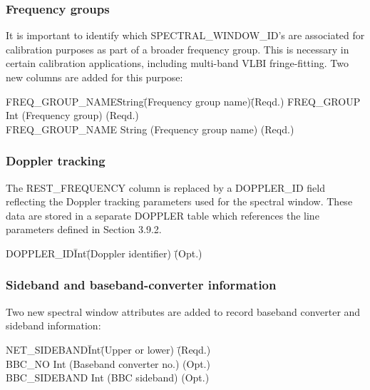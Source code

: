 \documentclass{article}
\begin{document}
\begin{itemize}
\subsubsection{Frequency groups}

It is important to identify which SPECTRAL\_WINDOW\_ID's are
associated for calibration purposes as part of a broader frequency
group.  This is necessary in certain calibration applications,
including multi-band VLBI fringe-fitting. Two new columns are
added for this purpose:

\begin{tabbing}
FREQ\_GROUP\_NAME\quad\quad \= String\quad\quad \=
(Frequency group name)\quad\quad \= (Reqd.) \kill
FREQ\_GROUP \> Int \> (Frequency group) \> (Reqd.) \\
FREQ\_GROUP\_NAME \> String \> (Frequency group name) \> (Reqd.) \\
\end{tabbing}

\subsubsection{Doppler tracking}

The REST\_FREQUENCY column is replaced by a DOPPLER\_ID field
reflecting the Doppler tracking parameters used for the spectral
window. These data are stored in a separate DOPPLER table which
references the line parameters defined in Section 3.9.2.

\begin{tabbing}
DOPPLER\_ID\quad\quad \= Int\quad\quad \= 
(Doppler identifier) \quad\quad\quad\quad\quad \= (Opt.) \\
\end{tabbing}

\subsubsection{Sideband and baseband-converter information}

Two new spectral window attributes are added to record baseband
converter and sideband information:

\begin{tabbing}
NET\_SIDEBAND\quad\quad \= Int\quad\quad \= 
(Upper or lower) \quad\quad\quad\quad\quad \= (Reqd.) \\
BBC\_NO           \> Int  \> 
(Baseband converter no.) \> (Opt.) \\
BBC\_SIDEBAND     \> Int \>
(BBC sideband) \> (Opt.) \\
\end{tabbing}


\end{itemize}
\end{document}
